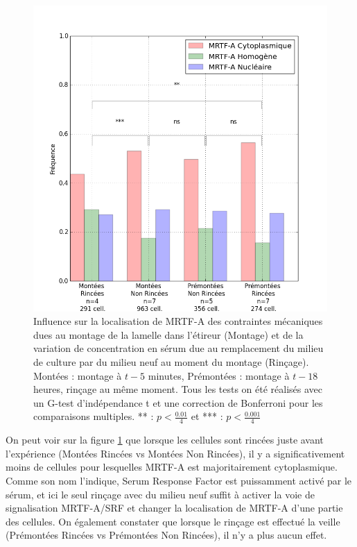 \begin{figure}
\includegraphics[scale=0.5]{Figures/CHN_montage_rincage.png} 
\caption{\label{CHN_montage} Influence sur la localisation de MRTF-A des contraintes mécaniques dues au montage de la lamelle dans l'étireur (Montage) et de la variation de concentration en sérum due au remplacement du milieu de culture par du milieu neuf au moment du montage (Rinçage). Montées : montage à $t-5$ minutes, Prémontées : montage à $t-18$ heures, rinçage au même moment.
Tous les tests on été réalisés avec un G-test d'indépendance t et une correction de Bonferroni pour les comparaisons multiples. ** : $p<\frac{0.01}{4}$ et *** : $p<\frac{0.001}{4}$}
\end{figure}

On peut voir sur la figure \ref{CHN_montage} que lorsque les cellules sont rincées juste avant l'expérience (Montées Rincées vs Montées Non Rincées), il y a significativement moins de cellules pour lesquelles MRTF-A est majoritairement cytoplasmique. 
Comme son nom l'indique, Serum Response Factor est puissamment activé par le sérum, et ici le seul rinçage avec du milieu neuf suffit à activer la voie de signalisation MRTF-A/SRF et changer la localisation de MRTF-A d'une partie des cellules. 
On également constater que lorsque le rinçage est effectué la veille (Prémontées Rincées vs Prémontées Non Rincées), il n'y a plus aucun effet. 


